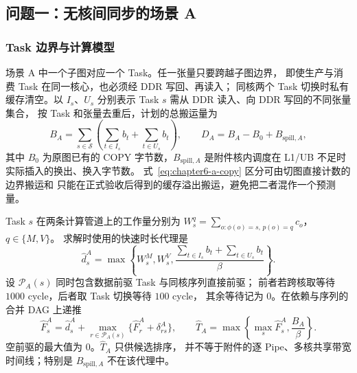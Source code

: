 \subsection{问题一：无核间同步的场景 A}
\subsubsection{Task 边界与计算模型}
场景 A 中一个子图对应一个 Task。任一张量只要跨越子图边界，
即使生产与消费 Task 在同一核心，也必须经 DDR 写回、再读入；
同核两个 Task 切换时私有缓存清空。以 $I_s$、$U_s$ 分别表示
Task $s$ 需从 DDR 读入、向 DDR 写回的不同张量集合，
按 Task 和张量去重后，计划的总搬运量为
\begin{equation}
B_A=\sum_{s\in\mathcal S}\left(\sum_{t\in I_s}b_t+\sum_{t\in U_s}b_t\right),
\qquad D_A=B_A-B_0+B_{\mathrm{spill},A},
\label{eq:chapter6-a-copy}
\end{equation}
其中 $B_0$ 为原图已有的 COPY 字节数，$B_{\mathrm{spill},A}$
是附件核内调度在 L1/UB 不足时实际插入的换出、换入字节数。
式~\eqref{eq:chapter6-a-copy} 区分可由切图直接计数的边界搬运和
只能在正式验收后得到的缓存溢出搬运，避免把二者混作一个预测量。

Task $s$ 在两条计算管道上的工作量分别为
$W_s^q=\sum_{o:\phi(o)=s,\,p(o)=q}c_o$，$q\in\{M,V\}$。
求解时使用的快速时长代理是
\begin{equation}
\widehat d_s^A=\max\left\{W_s^M,W_s^V,
\frac{\sum_{t\in I_s}b_t+\sum_{t\in U_s}b_t}{\beta}\right\}.
\label{eq:chapter6-a-task}
\end{equation}
设 $\mathcal P_A(s)$ 同时包含数据前驱 Task 与同核序列直接前驱；
前者若跨核取等待 $1000$ cycle，后者取 Task 切换等待 $100$ cycle，
其余等待记为 $0$。在依赖与序列的合并 DAG 上递推
\begin{equation}
\widehat F_s^A=\widehat d_s^A+
\max_{r\in\mathcal P_A(s)}\{\widehat F_r^A+\delta^A_{rs}\},
\qquad
\widehat T_A=\max\left\{\max_s\widehat F_s^A,\frac{B_A}{\beta}\right\}.
\label{eq:chapter6-a-proxy}
\end{equation}
空前驱的最大值为 $0$。$\widehat T_A$ 只供候选排序，
并不等于附件的逐 Pipe、多核共享带宽时间线；特别是
$B_{\mathrm{spill},A}$ 不在该代理中。

